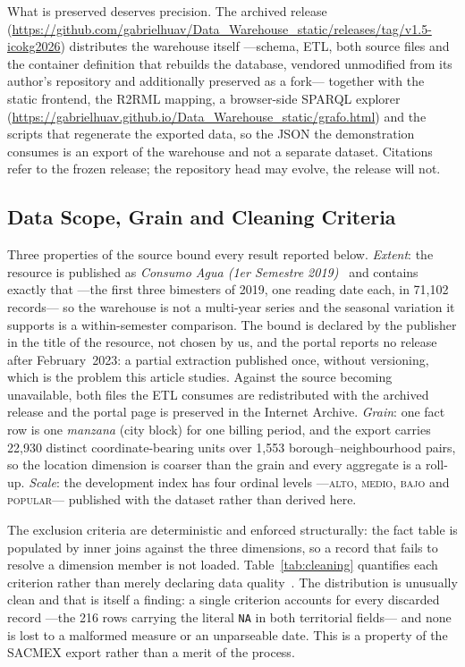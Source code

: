 \documentclass[runningheads]{llncs}
\newif\ifmarcarcambios
\newenvironment{icokgblock}{\ifmarcarcambios\color{nuevo}\fi}{}
\renewcommand{\_}{\origunderscore\allowbreak}
\begin{document}
\begin{icokgblock}
\noindent What is preserved deserves precision. The archived release
(\url{https://github.com/gabrielhuav/Data_Warehouse_static/releases/tag/v1.5-icokg2026})
distributes the warehouse itself ---schema, ETL, both source files and the
container definition that rebuilds the database, vendored unmodified from its
author's repository and additionally preserved as a fork--- together with the
static frontend, the R2RML mapping, a browser-side SPARQL explorer
(\url{https://gabrielhuav.github.io/Data_Warehouse_static/grafo.html}) and the
scripts that regenerate the exported data, so the JSON the demonstration consumes
is an export of the warehouse and not a separate dataset. Citations refer to the
frozen release; the repository head may evolve, the release will not.

\subsection{Data Scope, Grain and Cleaning Criteria}
\label{sec:grain}

Three properties of the source bound every result reported below.
\emph{Extent}: the resource is published as \emph{Consumo Agua (1er Semestre
2019)}~\cite{sacmex} and contains exactly that ---the first three bimesters of 2019, one
reading date each, in 71,102 records--- so the warehouse is not a multi-year
series and the seasonal variation it supports is a within-semester comparison.
The bound is declared by the publisher in the title of the resource, not chosen
by us, and the portal reports no release after February~2023: a partial
extraction published once, without versioning, which is the problem this article
studies. Against the source becoming unavailable, both files the ETL consumes are
redistributed with the archived release and the portal page is preserved in the
Internet Archive. \emph{Grain}: one fact row is one \emph{manzana} (city block)
for one billing period, and the export carries 22,930 distinct coordinate-bearing
units over 1,553 borough--neighbourhood pairs, so the location dimension is
coarser than the grain and every aggregate is a roll-up. \emph{Scale}: the
development index has four ordinal levels ---\textsc{alto}, \textsc{medio},
\textsc{bajo} and \textsc{popular}--- published with the dataset rather than
derived here.

The exclusion criteria are deterministic and enforced structurally: the fact
table is populated by inner joins against the three dimensions, so a record that
fails to resolve a dimension member is not loaded. Table~\ref{tab:cleaning}
quantifies each criterion rather than merely declaring data
quality~\cite{vetro2016}. The distribution is unusually clean and that is itself
a finding: a single criterion accounts for every discarded record ---the 216 rows
carrying the literal \texttt{NA} in both territorial fields--- and none is lost
to a malformed measure or an unparseable date. This is a property of the SACMEX
export rather than a merit of the process.


\end{icokgblock}
\end{document}
